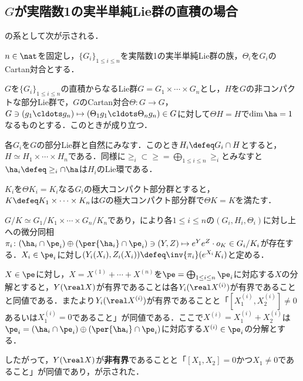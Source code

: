 \subsection{$G$が実階数1の実半単純Lie群の直積の場合}
の系として次が示される．
\begin{cor}\label{cor:0113-main}
  $n\in \nat$を固定し，$\{G_i \}_{1\leq i\leq n} $を実階数1の実半単純Lie群の族，$\Theta_i $を$G_i$のCartan対合とする．
  
  $G$を$\{G_i \}_{1\leq i\leq n} $の直積からなるLie群$G = G_1\times \cdots \times G_n $とし，$H$を$G$の非コンパクトな部分Lie群で，$G$のCartan対合$\Theta\colon G\to G $，$G\ni (g_1\cldots g_n)\mapsto (\Theta_1g_1\cldots \Theta_ng_n )\in G $に対して$\Theta H = H$で$\dim \ha = 1$なるものとする．このときが成り立つ．
\end{cor}


\begin{pfwn}{}

  各$G_i $を$G$の部分Lie群と自然にみなす．このとき$H_i\defeq G_i\cap H$とすると，$H \simeq H_1\times\cdots  \times H_n  $である．同様に$\ge_i\subset \ge = \bigoplus_{1\leq i\leq n}\ge_i $とみなすと$\ha_i\defeq \ge_i\cap \ha $は$H_i$のLie環である．

  $K_i$を$\Theta K_i = K_i $なる$G_i$の極大コンパクト部分群とすると，$K \defeq K_1\times \cdots \times K_n $は$G$の極大コンパクト部分群で$\Theta K = K $を満たす．

  $G/K\simeq G_1/K_1\times \cdots \times G_n/K_n $であり，により各$1\leq i\leq n$の$(G_i, H_i, \Theta_i) $に対し上への微分同相$\pi_i\colon  (\ha_i\cap\pe_i)\oplus (\per{\ha_i}\cap \pe_i) \ni (Y, Z)\mapsto e^{Y}e^{Z}\cdot o_K \in G_i/K_i $が存在する．$X_i\in \pe_i $に対し$(Y_i(X_i), Z_i(X_i))\defeq \inv{\pi_i}(e^{X_i}K_i) $と定める．

  $X\in \pe$に対し，$X = X^{(1)} +\cdots + X^{(n)} $を$\pe = \bigoplus_{1\leq i\leq n}\pe_i $に対応する$X$の分解とすると，$Y(\real X) $が有界であることは各$Y_i(\real X^{(i)}) $が有界であることと同値である．またより$Y_i(\real X^{(i)}) $が有界であることと「$[X_1^{(i)}, X_2^{(i)} ] \neq 0 $あるいは$X^{(i)}_1 = 0 $であること」が同値である．ここで$X^{(i)} =  X_1^{(i)} + X_2^{(i)}$は$\pe_i = (\ha_i\cap\pe_i)\oplus (\per{\ha_i}\cap\pe_i) $に対応する$X^{(i)}\in \pe_i $の分解とする．

  したがって，$Y(\real X) $が\textbf{非有界}であることと「$[X_1, X_2] = 0 $かつ$X_1 \neq 0 $であること」が同値であり，が示された．
  
  
\end{pfwn}